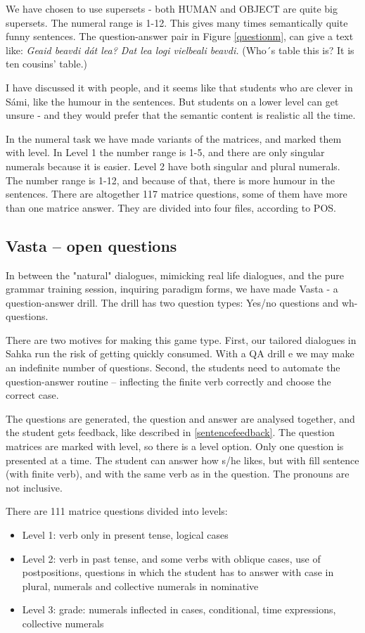 \documentclass[a4paper,12pt]{article}
\begin{document}
We have chosen to use supersets - both HUMAN and OBJECT are quite big supersets. The numeral range is 1-12. This gives many times semantically quite funny sentences. The question-answer pair in Figure \ref{questionm}, can give a text like: \textit{Geaid beavdi dát lea? Dat lea logi vielbeali beavdi.} (Who´s table this is? It is ten cousins’ table.) 

I have discussed it with people, and it seems like that students who are clever in Sámi, like the humour in the sentences. But students on a lower level can get unsure - and they would prefer that the semantic content is realistic all the time.   

In the numeral task we have made variants of the matrices, and marked them with level. In Level 1 the number range is 1-5, and there are only singular numerals because it is easier. Level 2 have both singular and plural numerals. The number range is 1-12, and because of that, there is more humour in the sentences. There are altogether 117 matrice questions, some of them have more than one matrice answer. They are divided into four files, according to POS.




\subsection{Vasta -- open questions}	

In between the "natural" dialogues, mimicking real life dialogues, and the pure grammar training session, inquiring paradigm forms, we have made Vasta - a question-answer drill. The drill has two question types: Yes/no questions and wh-questions. 

There are two motives for making this game type. First, our tailored dialogues in Sahka run the risk of getting quickly consumed. With a QA drill e we may make an indefinite number of questions. Second, the students need to automate the question-answer routine -- inflecting the finite verb correctly and choose the correct case.

The questions are generated, the question and answer are analysed together, and the student gets feedback, like described in \ref{sentencefeedback}. The question matrices are marked with level, so there is a level option. Only one question is presented at a time. The student can answer how s/he likes, but with fill sentence (with finite verb), and with the same verb as in the question. The pronouns are not inclusive.

There are 111 matrice questions divided into levels:
\begin{itemize}
\item Level 1: verb only in present tense, logical cases
\item  Level 2: verb in past tense, and some verbs with oblique cases, use of postpositions, questions in which the student has to answer with case in plural,  numerals and collective numerals in nominative
\item  Level 3: grade: numerals inflected in cases, conditional, time expressions, collective numerals
\end{itemize}
\vspace{0.5cm}
\end{document}
